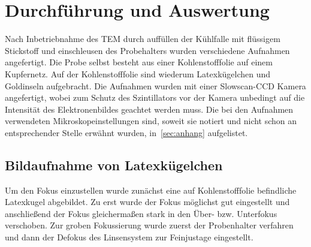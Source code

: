 \documentclass[slug=TEM, room=IFW, supervisor=?, coursedate=23.\ 01.\ 2020]{../../Lab_Report_LaTeX/lab_report}
\begin{document}
\section{Durchf\"uhrung und Auswertung}
\label{sec:durchaus}


Nach Inbetriebnahme des TEM durch auff\"ullen der K\"uhlfalle mit
fl\"ussigem Stickstoff und einschleusen des Probehalters wurden
verschiedene Aufnahmen angefertigt.
Die Probe selbst besteht aus einer Kohlenstofffolie auf einem
Kupfernetz. Auf der Kohlenstofffolie sind wiederum Latexk\"ugelchen und
Goldinseln aufgebracht.
Die Aufnahmen wurden mit einer Slowscan-CCD Kamera angefertigt,
wobei zum Schutz des Szintillators vor der Kamera unbedingt auf die
Intensität des Elektronenbildes geachtet werden muss.
Die bei den Aufnahmen verwendeten Mikroskopeinstellungen sind, soweit sie notiert und nicht
schon an entsprechender Stelle erwähnt wurden, in~\ref{sec:anhang} aufgelistet.

\subsection{Bildaufnahme von Latexkügelchen}
\label{sec:latex}

Um den Fokus einzustellen wurde zunächst eine auf Kohlenstofffolie
befindliche Latexkugel abgebildet. Zu erst wurde der Fokus möglichst
gut eingestellt und anschließend der Fokus gleichermaßen stark in den
Über- bzw. Unterfokus verschoben. Zur groben Fokussierung wurde zuerst
der Probenhalter verfahren und dann der Defokus des Linsensystem zur
Feinjustage eingestellt.
\end{document}

